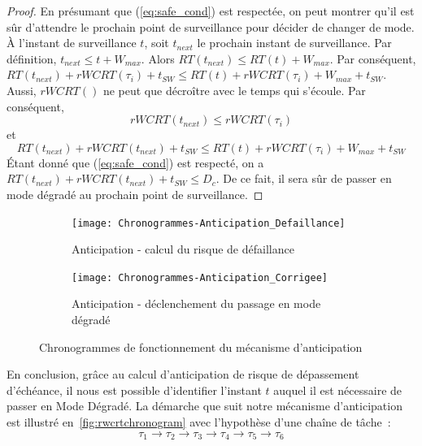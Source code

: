 \documentclass[french, a4paper, 11pt, twoside, pdftex]{StyleThese}
\begin{document}
    \begin{proof}
		En présumant que (\ref{eq:safe_cond}) est respectée, on peut montrer qu'il est sûr d'attendre le prochain point de surveillance pour décider de changer de mode. \nline
		À l'instant de surveillance $t$, soit $t_{next}$ le prochain instant de surveillance.\nline
		Par définition, $t_{next} \leq t + W_{max}$. Alors $RT(t_{next}) \leq RT(t) + W_{max}$. 
		Par conséquent, \smallbreak
		$RT(t_{next}) + rWCRT(\tau_i) + t_{SW} \leq RT(t) + rWCRT(\tau_i) + W_{max} + t_{SW}$. \nline
		Aussi, $rWCRT()$ ne peut que décroître avec le temps qui s'écoule. Par conséquent, %
		\[ rWCRT(t_{next}) \leq rWCRT(\tau_i)	\]
		et 
		\[ RT(t_{next}) + rWCRT(t_{next}) + t_{SW} \leq RT(t) + rWCRT(\tau_i) + W_{max} + t_{SW} \] 
		Étant donné que (\ref{eq:safe_cond}) est respecté, on a $RT(t_{next}) + rWCRT(t_{next}) + t_{SW} \leq D_c$.
		De ce fait, il sera sûr de passer en mode dégradé au prochain point de surveillance.  
    \end{proof}
    
	\begin{figure}[ht]
		\centering
		\begin{subfigure}{0.7\textwidth} \centering
			\texttt{[image: Chronogrammes-Anticipation\_Defaillance]}
			\caption[Anticipation - risque de défaillance]{Anticipation - calcul du risque de défaillance}
			\label{sufig:chrono_risque_defaillance}
		\end{subfigure}
		\begin{subfigure}{0.7\textwidth} \centering
			\texttt{[image: Chronogrammes-Anticipation\_Corrigee]}
			\caption[Anticipation - passage en mode dégradé]{Anticipation - déclenchement du passage en mode dégradé}
			\label{sufig:chrono_risque_ModeDegrade}
		\end{subfigure}
		\caption{Chronogrammes de fonctionnement du mécanisme d'anticipation}
		\label{fig:rwcrtchronogram}
	\end{figure}

    En conclusion, grâce au calcul d'anticipation de risque de dépassement d'échéance, il nous est possible d'identifier l'instant $t$ auquel il est nécessaire de passer en Mode Dégradé. La démarche que suit notre mécanisme d'anticipation est illustré en~\autoref{fig:rwcrtchronogram} avec l'hypothèse d'une chaîne de tâche~:
    \[  \tau_{1} \rightarrow \tau_{2} \rightarrow \tau_{3} \rightarrow \tau_{4} \rightarrow \tau_{5} \rightarrow \tau_{6} \] 
     
\end{document}
